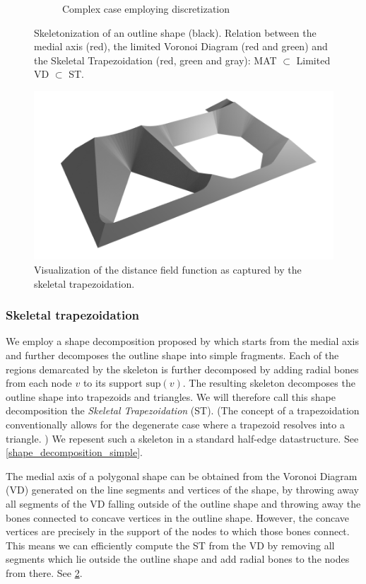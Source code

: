 \begin{figure}
\begin{subfigure}{0.65\columnwidth}
\caption{Complex case employing discretization}
\label{shape_decomp_complex}
\end{subfigure}
\caption{
Skeletonization of an outline shape (black).
Relation between the medial axis (red), the limited Voronoi Diagram (red and green) and the Skeletal Trapezoidation (red, green and gray): MAT $\subset$ Limited VD $\subset$ ST.
}
\label{skeletonization_comparison}
\end{figure}


\begin{figure} \centering
\includegraphics[width=.75\columnwidth]{sources/method/mat_3d_blender_render.png}
\caption{
Visualization of the distance field function as captured by the skeletal trapezoidation.
}
\label{mat_3d}
\end{figure}



\subsubsection{Skeletal trapezoidation}
We employ a shape decomposition proposed by \citeauthor{Ding2016a} which starts from the medial axis and further decomposes the outline shape into simple fragments. \cite{Ding2016a}
Each of the regions demarcated by the skeleton is further decomposed by adding radial bones from each node $v$ to its support $\text{sup}(v)$.
The resulting skeleton decomposes the outline shape into trapezoids and triangles.
We will therefore call this shape decomposition the \emph{Skeletal Trapezoidation} (ST).
(The concept of a trapezoidation conventionally allows for the degenerate case where a trapezoid resolves into a triangle. \cite{chazelle1984,fournier1984})
We repesent such a skeleton in a standard half-edge datastructure.
See \cref{shape_decomposition_simple}.


The medial axis of a polygonal shape can be obtained from the Voronoi Diagram (VD) generated on the line segments and vertices of the shape, by throwing away all segments of the VD falling outside of the outline shape and throwing away the bones connected to concave vertices in the outline shape. \cite{lee1982medial}
However, the concave vertices are precisely in the support of the nodes to which those bones connect.
This means we can efficiently compute the ST from the VD by removing all segments which lie outside the outline shape and add radial bones to the nodes from there.
See \cref{skeletonization_comparison}.


